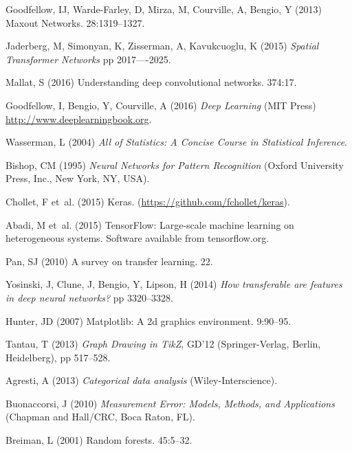 \documentclass[%
reprint,
superscriptaddress,
 aps,
 pre,
]{revtex4-1}
\begin{document}
\begin{thebibliography}{10}
Goodfellow, IJ, Warde-Farley, D, Mirza, M, Courville, A, Bengio, Y
\newblock (2013) {Maxout Networks}.
 28:1319--1327.

Jaderberg, M, Simonyan, K, Zisserman, A, Kavukcuoglu, K
\newblock (2015) {\em {Spatial Transformer Networks}}
\newblock pp 2017----2025.

Mallat, S
\newblock (2016) {Understanding deep convolutional networks.}
 374:17.

Goodfellow, I, Bengio, Y, Courville, A
\newblock (2016) {\em Deep Learning}
\newblock (MIT Press)
\newblock \url{http://www.deeplearningbook.org}.

Wasserman, L
\newblock (2004) {\em All of Statistics: A Concise Course in Statistical
  Inference}.

Bishop, CM
\newblock (1995) {\em Neural Networks for Pattern Recognition}
\newblock (Oxford University Press, Inc., New York, NY, USA).

Chollet, F et~al.
\newblock (2015) Keras. (\url{https://github.com/fchollet/keras}).

Abadi, M et~al.
\newblock (2015) {TensorFlow}: Large-scale machine learning on heterogeneous
  systems.
\newblock Software available from tensorflow.org.

Pan, SJ
\newblock (2010) {A survey on transfer learning}.
 22.

Yosinski, J, Clune, J, Bengio, Y, Lipson, H
\newblock (2014) {\em {How transferable are features in deep neural networks?}}
\newblock pp 3320--3328.

Hunter, JD
\newblock (2007) Matplotlib: A 2d graphics environment.
 9:90--95.

Tantau, T
\newblock (2013) {\em Graph Drawing in {TikZ}}, GD'12
\newblock (Springer-Verlag, Berlin, Heidelberg), pp 517--528.

Agresti, A
\newblock (2013) {\em {Categorical data analysis}}
\newblock (Wiley-Interscience).

Buonaccorsi, J
\newblock (2010) {\em Measurement Error: Models, Methods, and Applications}
\newblock (Chapman and Hall/CRC, Boca Raton, FL).

Breiman, L
\newblock (2001) Random forests.
 45:5--32.

\end{thebibliography}



  
\end{document}
